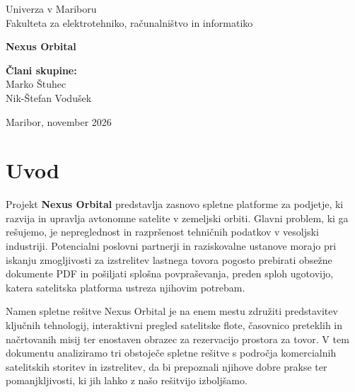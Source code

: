 \documentclass[11pt, a4paper]{article}
\begin{document}
\renewcommand*\contentsname{Kazalo}
\renewcommand*\tablename{Tabela}
\renewcommand*\figurename{Slika}

\begin{titlepage}
    \centering
    \vspace*{2cm}
    {\Large Univerza v Mariboru \\
    Fakulteta za elektrotehniko, računalništvo in informatiko \par}
    \vspace{0.5cm}

    \vspace{5cm}
    {\Huge \textbf{Nexus Orbital} \par}

    \vspace{11cm}
    \begin{flushleft}
        \large
        \textbf{Člani skupine:} \\
        Marko Štuhec \\
        Nik-Štefan Vodušek
    \end{flushleft}

    \vfill
    {\large Maribor, november 2026 \par}
\end{titlepage}

\tableofcontents

\section{Uvod}

Projekt \textbf{Nexus Orbital} predstavlja zasnovo spletne platforme za podjetje, ki razvija in upravlja avtonomne satelite v zemeljski orbiti. Glavni problem, ki ga rešujemo, je nepreglednost in razpršenost tehničnih podatkov v vesoljski industriji. Potencialni poslovni partnerji in raziskovalne ustanove morajo pri iskanju zmogljivosti za izstrelitev lastnega tovora pogosto prebirati obsežne dokumente PDF in pošiljati splošna povpraševanja, preden sploh ugotovijo, katera satelitska platforma ustreza njihovim potrebam.

Namen spletne rešitve Nexus Orbital je na enem mestu združiti predstavitev ključnih tehnologij, interaktivni pregled satelitske flote, časovnico preteklih in načrtovanih misij ter enostaven obrazec za rezervacijo prostora za tovor. V tem dokumentu analiziramo tri obstoječe spletne rešitve s področja komercialnih satelitskih storitev in izstrelitev, da bi prepoznali njihove dobre prakse ter pomanjkljivosti, ki jih lahko z našo rešitvijo izboljšamo.
\end{document}
